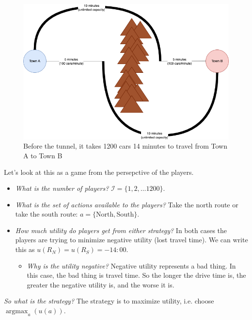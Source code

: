 \documentclass[11pt]{article}
\begin{document}
\begin{figure}
    \centering
    \includegraphics[width=5in]{braess_1.png}
    \caption{Before the tunnel, it takes 1200 cars 14 minutes to travel from Town A to Town B}
\end{figure}


Let's look at this as a game from the persepctive of the players. 

\begin{itemize}
    \item {\it What is the number of players?} $\mathcal{I} = \{1,2,\ldots 1200\}$.
    \item {\it What is the set of actions available to the players?} Take the north route or take the south route: $a = \{\text{North}, \text{South}\}$.
    \item {\it How much utility do players get from either strategy?} In both cases the players are trying to minimize negative utility (lost travel time). We can write this as $u(R_N) = u(R_S) = -14{:}00$.
    \begin{itemize}
        \item {\it Why is the utility negative?} Negative utility represents a bad thing. In this case, the bad thing is travel time. So the longer the drive time is, the greater the negative utility is, and the worse it is.
    \end{itemize}
\end{itemize}


{\it So what is the strategy?} The strategy is to maximize utility, i.e. choose $\operatorname*{argmax}_a (u(a))$.
\end{document}
